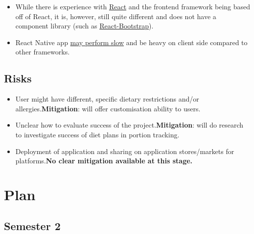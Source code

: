 \documentclass[11pt]{article}
\begin{document}
\begin{itemize}
    \tightlist
    \item While there is experience with \href{https://reactjs.org/}{React} and the frontend framework being based off of React, it is, however, still quite different and does not have a component library (such as \href{https://react-bootstrap.github.io/}{React-Bootstrap}).
    \item React Native app \href{https://reactnative.dev/docs/performance}{may perform slow} and be heavy on client side compared to other frameworks.
\end{itemize}

\subsection{Risks}\label{risks}

\begin{itemize}
    \tightlist
    \item User might have different, specific dietary restrictions and/or allergies.\newline \textbf{Mitigation}: will offer customisation ability to users.
    \item Unclear how to evaluate success of the project.\newline\textbf{Mitigation}: will do research to investigate success of diet plans in portion tracking.
    \item Deployment of application and sharing on application stores/markets for platforms.\newline\textbf{No clear mitigation available at this stage.}
\end{itemize}

\section{Plan}\label{plan}

\subsection{Semester 2}
\end{document}
